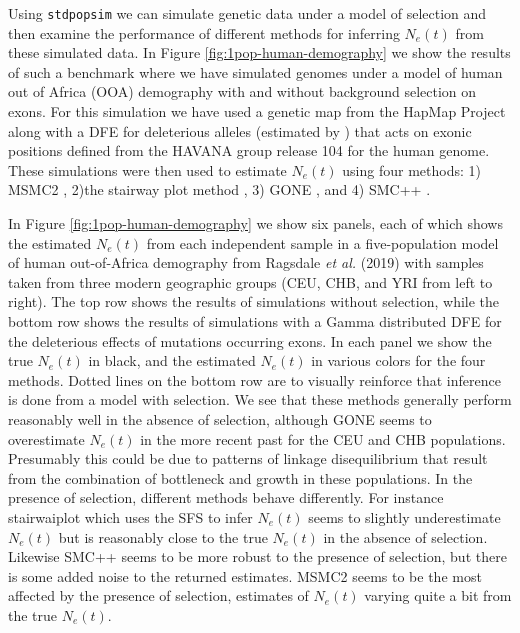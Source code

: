 \documentclass[hidelinks]{article}
\newcommand{\stdpopsim}{\texttt{stdpopsim}\xspace}
\begin{document}
    Using \stdpopsim we can simulate genetic data under a model of selection and then 
    examine the performance of different methods for inferring $N_e(t)$ from these simulated 
    data. In Figure \ref{fig:1pop-human-demography} we show the results of such a benchmark
    where we have simulated genomes under a model of human out of Africa (OOA) demography
    with and without background selection on exons. For this simulation we have used
    a genetic map from the HapMap Project \citep{international2007second} along with a
    DFE for deleterious alleles (estimated by \cite{huber2017determining})
    that acts on exonic positions defined from the HAVANA group release 104 for the human genome. 
    These simulations were then used to estimate $N_e(t)$ using four methods: 1) MSMC2 \citep{Schiffels2020}, 
    2)the stairway plot method \citep{liu2020stairway}, 3) GONE \citep{santiago2020recent}, and 4) SMC++ \citep{terhorst2017robust}.

    In Figure \ref{fig:1pop-human-demography} we show six panels, each of which shows the estimated $N_e(t)$
    from each independent sample in a five-population model of human out-of-Africa demography
    from Ragsdale \textit{et al.} (2019)
    with samples taken from three modern geographic groups (CEU, CHB, and YRI from left to right).
    The top row shows the results of simulations without selection, while the bottom row shows the results
    of simulations with a Gamma distributed DFE for the deleterious effects of mutations occurring exons. In each panel we show the true $N_e(t)$ in black, and the estimated $N_e(t)$
    in various colors for the four methods. Dotted lines on the bottom row are to visually reinforce that inference is done
    from a model with selection. We see that these methods generally perform reasonably well in the absence of selection, 
    although GONE seems to overestimate $N_e(t)$ in the more recent past for the CEU and CHB populations.
    Presumably this could be due to patterns of linkage disequilibrium that result from the combination
    of bottleneck and growth in these populations.
    In the presence of selection, different methods behave differently. 
    For instance stairwaiplot which uses the SFS to infer $N_e(t)$ seems to slightly underestimate $N_e(t)$
    but is reasonably close to the true $N_e(t)$ in the absence of selection.
    Likewise SMC++ seems to be more robust to the presence of selection,
    but there is some added noise to the returned estimates. 
    MSMC2 seems to be the most affected by the presence of selection, 
    estimates of $N_e(t)$ varying quite a bit from the true $N_e(t)$.
\end{document}
